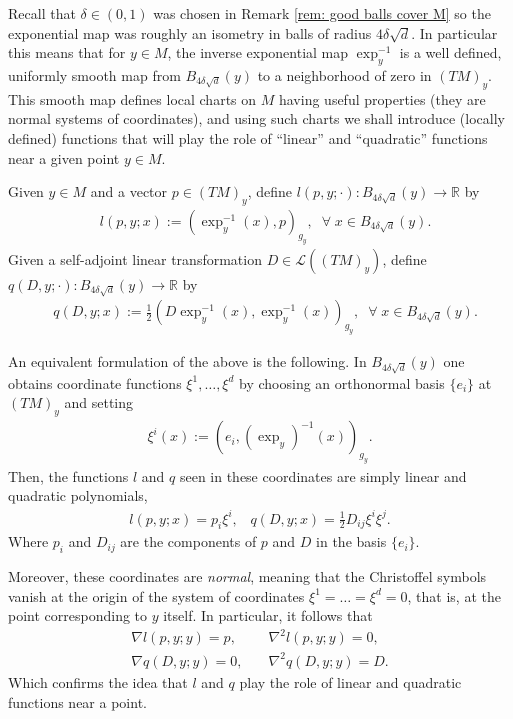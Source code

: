 \documentclass[11pt,reqno]{amsart}
\numberwithin{equation}{section}
\theoremstyle{plain}
\def\L{\mathcal L}
\begin{document}
  Recall that $\delta \in (0,1)$ was chosen in Remark \ref{rem: good balls cover M} so the exponential map was roughly an isometry in balls of radius $4\delta \sqrt{d}$. In particular this means that for $y \in M$, the inverse exponential map $\exp_{y}^{-1}$ is a well defined, uniformly smooth map from $B_{4\delta \sqrt{d}}(y)$ to a neighborhood of zero in $(TM)_y$. This smooth map defines local charts on $M$ having useful properties (they are normal systems of coordinates), and using such charts we shall introduce (locally defined) functions that will play the role of  ``linear'' and ``quadratic'' functions near a given point $y \in M$.
  
  \begin{DEF}\label{def:LinearAndQuadPolynomials}
    Given $y \in M$ and a vector $p \in (TM)_{y}$, define $l(p,y;\cdot):B_{4\delta\sqrt{d}}(y)\to\mathbb{R}$ by
    \begin{align*}
      &l(p,y;x) := (\exp_{y}^{-1}(x),p)_{g_{y}},\;\;\forall\;x\in B_{4\delta\sqrt{d}}(y).
    \end{align*}
    Given a self-adjoint linear transformation $D\in \L((TM)_{y})$, define $q(D,y;\cdot): B_{4\delta\sqrt{d}}(y)\to\mathbb{R}$ by 
    \begin{align*}
      & q(D,y;x) := \tfrac{1}{2}(D\exp_{y}^{-1}(x),\exp_{y}^{-1}(x))_{g_{y}},\;\;\forall\;x\in B_{4\delta\sqrt{d}}(y).
    \end{align*}	 

  \end{DEF}
  
  \begin{rem}\label{rem:FinDimApp l and q derivatives in a chart}
    An equivalent formulation of the above is the following. In $B_{4\delta \sqrt{d}}(y)$ one obtains coordinate functions $\xi^1,\ldots,\xi^d$ by choosing an orthonormal basis $\{e_i\}$ at $(TM)_y$ and setting
    \begin{align*}	
      \xi^i(x):= (e_i,(\exp_{y})^{-1}(x))_{g_y}.	
    \end{align*}
    Then, the functions $l$ and $q$ seen in these coordinates are simply linear and quadratic polynomials,
    \begin{align*}	
      l(p,y;x) = p_i\xi^i,\;\;\; q(D,y;x) = \tfrac{1}{2}D_{ij}\xi^i\xi^j.  	
    \end{align*}	
    Where $p_i$ and $D_{ij}$ are the components of $p$ and $D$ in the basis $\{e_i\}$.
	
    Moreover, these coordinates are \emph{normal}, meaning that the Christoffel symbols vanish at the origin of the system of coordinates $\xi^1=\ldots=\xi^d=0$, that is, at the point corresponding to $y$ itself. In particular, it follows that 	
    \begin{align*}
      \nabla l(p,y;y)= p, & \quad \nabla^2 l(p,y;y) = 0,\\
      \nabla q(D,y;y)= 0, & \quad \nabla^2 q(D,y;y) = D.
    \end{align*}			
    Which confirms the idea that $l$ and $q$ play the role of linear and quadratic functions near a point.	
  \end{rem}
  
\end{document}
